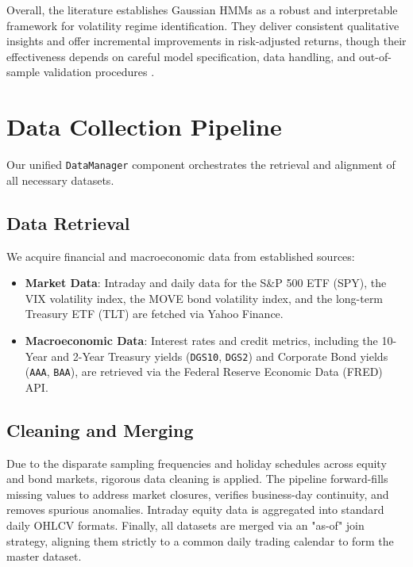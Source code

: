 \documentclass[a4paper,fleqn]{cas-sc}
\begin{document}
Overall, the literature establishes Gaussian HMMs as a robust and interpretable framework for volatility regime identification. They deliver consistent qualitative insights and offer incremental improvements in risk-adjusted returns, though their effectiveness depends on careful model specification, data handling, and out-of-sample validation procedures \cite{Duriez2025, Wang2020}.

\section{Data Collection Pipeline}
Our unified \texttt{DataManager} component orchestrates the retrieval and alignment of all necessary datasets.

\subsection{Data Retrieval}
We acquire financial and macroeconomic data from established sources:
\begin{itemize}
    \item \textbf{Market Data}: Intraday and daily data for the S\&P 500 ETF (SPY), the VIX volatility index, the MOVE bond volatility index, and the long-term Treasury ETF (TLT) are fetched via Yahoo Finance.
    \item \textbf{Macroeconomic Data}: Interest rates and credit metrics, including the 10-Year and 2-Year Treasury yields (\texttt{DGS10}, \texttt{DGS2}) and Corporate Bond yields (\texttt{AAA}, \texttt{BAA}), are retrieved via the Federal Reserve Economic Data (FRED) API.
\end{itemize}

\subsection{Cleaning and Merging}
Due to the disparate sampling frequencies and holiday schedules across equity and bond markets, rigorous data cleaning is applied. The pipeline forward-fills missing values to address market closures, verifies business-day continuity, and removes spurious anomalies. Intraday equity data is aggregated into standard daily OHLCV formats. Finally, all datasets are merged via an "as-of" join strategy, aligning them strictly to a common daily trading calendar to form the master dataset.
\end{document}
